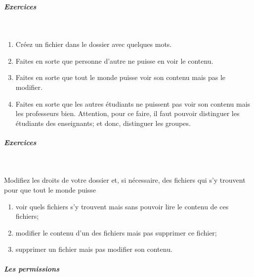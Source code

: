 \documentclass[11pt,a4paper]{article}
\begin{document}
			
		\subparagraph{Exercices} 
		
					\textcolor{white}{.} \par
				
            \par
        
					\begin{enumerate}
				
			\item Cr\'eez un fichier \verb@brol@ dans le dossier \verb@tdLinux@ avec quelques mots.
			\item Faites en sorte que personne d'autre ne puisse en voir le contenu.
			\item Faites en sorte que tout le monde puisse voir son contenu mais pas le modifier. 
			\item 
					  Faites en sorte que les autres \'etudiants ne puissent pas voir son contenu mais les professeurs bien. 
					  Attention, pour ce faire, il faut pouvoir distinguer les \'etudiants des enseignants; et donc, distinguer les groupes.
					
					\end{enumerate}
				
			
		\subparagraph{Exercices} 
		
					\textcolor{white}{.} \par
				
            \par
          
					Modifiez les droits de votre dossier \verb@tdLinux@ et, si n\'ecessaire, 
					des fichiers qui s'y trouvent pour que tout le monde puisse  
				
            \par
        
					\begin{enumerate}
				
			\item voir quels fichiers s'y trouvent mais sans pouvoir lire le contenu de ces fichiers;
			\item modifier le contenu d'un des fichiers mais pas supprimer ce fichier;
			\item supprimer un fichier mais pas modifier son contenu.
					\end{enumerate}
				
			
		\subparagraph{Les permissions} 
		
\end{document}
